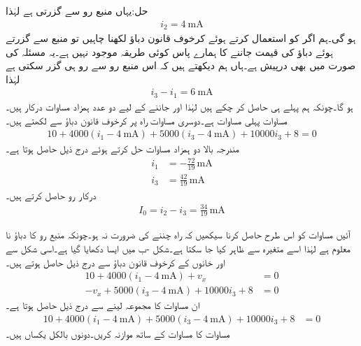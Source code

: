 حل:یہاں  منبع رو سے گزرتی ہے لہٰذا
\begin{align*}
i_2=\SI{4}{\milli\ampere}
\end{align*}
ہو گی۔ہم اگر  کو استعمال کرتے ہوئے کرخوف قانون دباؤ لکھنا چاہیں تو  منبع سے گزرتے ہوئے دباؤ کی قیمت جاننے کا ہمارے پاس کوئی طریقہ موجود نہیں ہے۔یہ مسئلہ  کی صورت میں بھی درپیش ہے۔ہاں ہم دیکھتے ہیں کہ اس منبع رو سے  رو ہی گزر سکتی ہے لہٰذا
\begin{align}\label{مساوات_جوڑ_پہلی_ہمزاد_مساوات}
i_3-i_1=\SI{6}{\milli\ampere}
\end{align}
ہو گا۔چونکہ  ہم پہلے ہی حاصل کر چکے ہیں لہٰذا  اور  جاننے کے لیے دو عدد ہمزاد مساوات درکار ہیں۔مساوات  پہلی مساوات  ہے۔دوسری مساوات راہ  پر کرخوف قانون دباؤ سے لکھتے ہیں۔
\begin{align}\label{مساوات_جوڑ_مخلوط_خانہ_الف}
10+4000(i_1-\SI{4}{\milli\ampere})+5000(i_3-\SI{4}{\milli\ampere})+10000i_3+8=0
\end{align} 
مندرجہ بالا دو ہمزاد مساوات حل کرتے ہوئے درج ذیل حاصل ہوتا ہے۔
\begin{align*}
i_1&=-\frac{72}{19} \, \si{\milli\ampere}\\
i_3&=\frac{42}{19} \, \si{\milli\ampere}
\end{align*}
درکار رو حاصل کرتے ہیں۔
\begin{align*}
I_0=i_2-i_3=\frac{34}{19} \, \si{\milli\ampere}
\end{align*}

آئیں مساوات  کو اس طرح حاصل کرنا سیکھیں کہ راہ  چننے کی ضرورت نہ ہو۔چونکہ  منبع رو کا دباؤ نا معلوم ہے لہٰذا اسے  متغیرہ سے ظاہر کیا جا سکتا ہے۔شکل -ب میں ایسا دکھایا گیا ہے۔اسی شکل سے  اور  خانوں کے کرخوف قانون دباؤ سے درج ذیل حاصل ہوتے ہیں۔
\begin{align*}
10+4000(i_1-\SI{4}{\milli\ampere})+v_x&=0\\
-v_x+5000(i_3-\SI{4}{\milli\ampere})+10000i_3+8&=0
\end{align*}
ان مساوات کا مجموعہ لینے سے درج ذیل حاصل ہوتا ہے۔
\begin{align}\label{مساوات_جوڑ_مخلوط_خانہ_ب}
10+4000(i_1-\SI{4}{\milli\ampere})+5000(i_3-\SI{4}{\milli\ampere})+10000i_3+8&=0
\end{align}
مساوات  کا مساوات  کے ساتھ موازنہ کریں۔دونوں بالکل یکساں ہیں۔

